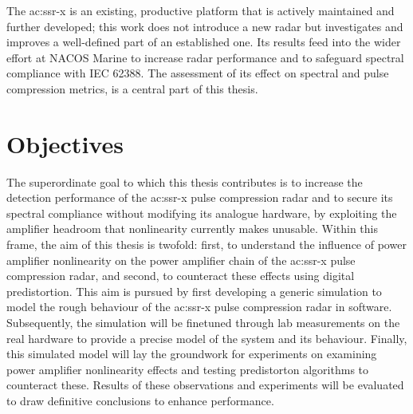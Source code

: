 The \gls{ac:ssr-x} is an existing, productive platform that is actively maintained and further developed; this work does not introduce a new radar but investigates and improves a well-defined part of an established one. Its results feed into the wider effort at NACOS Marine to increase radar performance and to safeguard spectral compliance with IEC 62388. The assessment of its effect on spectral and pulse compression metrics, is a central part of this thesis. 

\section{Objectives}

The superordinate goal to which this thesis contributes is to increase the detection performance of the \gls{ac:ssr-x} pulse compression radar and to secure its spectral compliance without modifying its analogue hardware, by exploiting the amplifier headroom that nonlinearity currently makes unusable. Within this frame, the aim of this thesis is twofold: first, to understand the influence of power amplifier nonlinearity on the power amplifier chain of the \gls{ac:ssr-x} pulse compression radar, and second, to counteract these effects using digital predistortion. This aim is pursued by first developing a generic simulation to model the rough behaviour of the \gls{ac:ssr-x} pulse compression radar in software. Subsequently, the simulation will be finetuned through lab measurements on the real hardware to provide a precise model of the system and its behaviour. Finally, this simulated model will lay the groundwork for experiments on examining power amplifier nonlinearity effects and testing predistorton algorithms to counteract these. Results of these observations and experiments will be evaluated to draw definitive conclusions to enhance performance. 